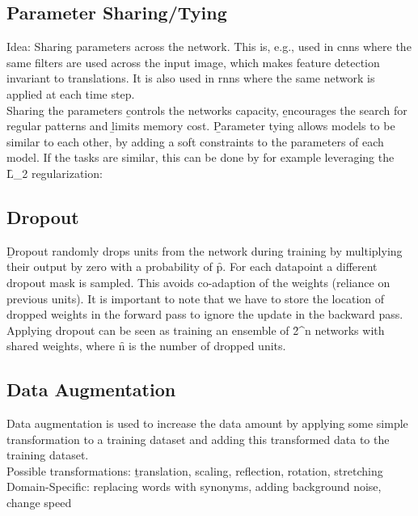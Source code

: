 \subsection{Parameter Sharing/Tying}
Idea: Sharing parameters across the network. This is, e.g., used in \acp{cnn} where the same filters are used across the input image, which makes feature detection invariant to translations. It is also used in \acp{rnn} where the same network is applied at each time step.\\
Sharing the parameters \b{controls the networks capacity}, \b{encourages the search for regular patterns} and \b{limits memory cost}.
\b{Parameter tying} allows models to be similar to each other, by adding a soft constraints to the parameters of each model. If the tasks are similar, this can be done by for example leveraging the \f{L_2} regularization:

\subsection{Dropout}
\b{Dropout} randomly drops units from the network during training by multiplying their output by zero with a probability of \f{p}. For each datapoint a different dropout mask is sampled. This avoids co-adaption of the weights (reliance on previous units). It is important to note that we have to store the location of dropped weights in the forward pass to ignore the update in the backward pass.\\[0.5em]

Applying dropout can be seen as training an ensemble of \f{2^n} networks with shared weights, where \f{n} is the number of dropped units.

\subsection{Data Augmentation}
Data augmentation is used to increase the data amount by applying some simple transformation to a training dataset and adding this transformed data to the training dataset.\\[0.5em]
Possible transformations: \b{translation, scaling, reflection, rotation, stretching}\\
Domain-Specific: replacing words with synonyms, adding background noise, change speed\\


